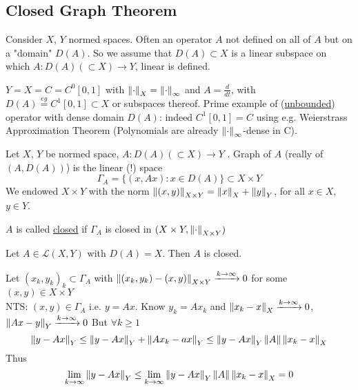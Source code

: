 \subsection{Closed Graph Theorem}
Consider $X$, $Y$ normed spaces. Often an operator $A$ not defined on all of $A$ but on a "domain" $D(A)$. So we assume that 
$D(A)\subset X$ is a linear subspace on which $A:D(A)(\subset X)\to Y$, linear is defined.
\begin{example}\nl
$Y=X=C=C^0[0,1]$ with $\left\|{\cdot}\right\|_X=\left\|{\cdot}\right\|_\infty$ and $A=\frac{d}{dt}$, with $D(A)\stackrel{eg}{=}C^1[0,1]\subset X$ or subspaces thereof. Prime example of  (\underline{unbounded}) operator with dense domain $D(A)$: indeed $C^1[0,1]=C$ using e.g. Weierstrass Approximation Theorem (Polynomials are already $\left\|{\cdot}\right\|_\infty$-dense in C).
\end{example}
\begin{definition}[Graph]\nl
Let $X$, $Y$ be normed space, $A:D(A)(\subset X)\to Y$ . Graph of $A$ (really  of $(A,D(A))$) is the linear (!) space 
$$
\Gamma_A=\{(x,Ax):x\in D(A)\}\subset X\times Y
$$
We endowed $X\times Y$ with the norm $\left\|{(x,y)}\right\|_{X\times Y}=\left\|{x}\right\|_X+\left\|{y}\right\|_Y$, for all $x\in X$, $y\in Y$.
    
\end{definition}
\begin{definition}\label{Closed Operator}\nl
$A$ is called \underline{closed} if $\Gamma_A$ is closed in  $(X\times Y,\left\|{\cdot}\right\|_{X\times Y})$
\end{definition}

\begin{example}\rm
Let $A\in\mathcal{L}(X,Y)$ with $D(A)=X$. Then $A$ is closed.
\begin{pf}{}{}
	Let $(x_k,y_k)_k\subset \Gamma_A$  with $\left\|{(x_k,y_k)-(x,y)}\right\|_{X\times Y}\xrightarrow{k\to\infty}0$ for some $(x,y)\in X\times Y$\\
	NTS: $(x,y)\in \Gamma_A$ i.e. $y=Ax$. 
	Know $ y_k=Ax_k$ and $\left\|{x_k-x}\right\|_X\xrightarrow{k\to\infty}0$, $\left\|{Ax-y}\right\|_Y\xrightarrow{k\to\infty}0$
	But $\forall k\geq 1$
	$$\left\|{y-Ax}\right\|_Y\leq\left\|{y-Ax}\right\|_Y+\left\|{Ax_k-ax}\right\|_Y
	\leq \left\|{y-Ax}\right\|_Y\left\|{A}\right\|\left\|{x_k-x}\right\|_X$$
	Thus 
	$$\lim_{k\to\infty}\left\|{y-Ax}\right\|_Y\leq\lim_{k\to\infty}\left\|{y-Ax}\right\|_Y\left\|{A}\right\|\left\|{x_k-x}\right\|_X=0$$
\end{pf}
\end{example}

